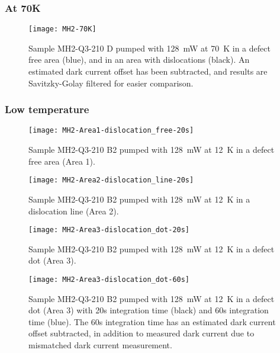 \subsubsection{At 70K}
\begin{figure}[H]
\centering
\texttt{[image: MH2-70K]}
\caption[MH2-Q3-210 at 70K]{Sample MH2-Q3-210 D pumped with 128~mW at 70~K in a defect free area (blue), and in an area with dislocations (black). An estimated dark current offset has been subtracted, and results are Savitzky-Golay filtered for easier comparison.}
\label{fig:MH2-70K}%
\end{figure}

\subsubsection{Low temperature}

\begin{figure}[H]
\centering
\texttt{[image: MH2-Area1-dislocation\_free-20s]}
\caption[MH2-Q3-210 at area 1]{Sample MH2-Q3-210 B2 pumped with 128~mW at 12~K in a defect free area (Area 1).}
\label{fig:MH2-Area1-dislocation_free-20s}%
\end{figure}

\begin{figure}[H]
\centering
\texttt{[image: MH2-Area2-dislocation\_line-20s]}
\caption[MH2-Q3-210 at area 2]{Sample MH2-Q3-210 B2 pumped with 128~mW at 12~K in a dislocation line (Area 2).}
\label{fig:MH2-Area2-dislocation_line-20s}%
\end{figure}

\begin{figure}[H]
\centering
\texttt{[image: MH2-Area3-dislocation\_dot-20s]}
\caption[MH2-Q3-210 at area 3]{Sample MH2-Q3-210 B2 pumped with 128~mW at 12~K in a defect dot (Area 3).}
\label{fig:MH2-Area3-dislocation_dot-20s}%
\end{figure}

\begin{figure}[H]
\centering
\texttt{[image: MH2-Area3-dislocation\_dot-60s]}
\caption[MH2-Q3-210 at area 3]{Sample MH2-Q3-210 B2 pumped with 128~mW at 12~K in a defect dot (Area 3) with 20s integration time (black) and 60s integration time (blue). The 60s integration time has an estimated dark current offset subtracted, in addition to measured dark current due to mismatched dark current measurement.}
\label{fig:MH2-Area3-dislocation_dot-60s}%
\end{figure}


